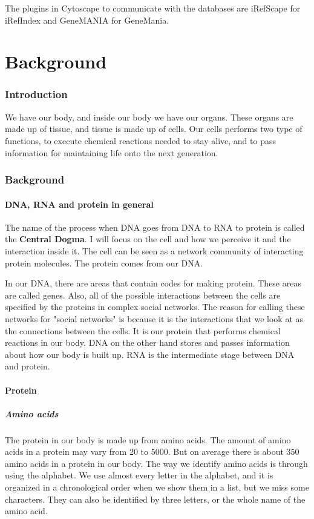 \documentclass[UKenglish,11pt,twoside,a4paper]{report}
\begin{document}
The plugins in Cytoscape to communicate with the databases are iRefScape \cite{iridb} for iRefIndex and GeneMANIA 
\cite{gmdb} for GeneMania.
\part{Background}
\section*{Introduction}
We have our body, and inside our body we have our organs. These organs are made up of tissue, and tissue is made up of
cells. Our cells performs two type of functions, to execute chemical reactions needed to stay alive, and to pass
information for maintaining life onto the next generation.
\section*{Background}
\subsection*{DNA, RNA and protein in general}
The name of the process when DNA goes from DNA to RNA to protein is called the \textbf{Central Dogma}. I will focus on
the cell and how we perceive it and the interaction inside it. The cell can be seen as a network community of
interacting protein molecules. The protein comes from our DNA.

In our DNA, there are areas that contain codes for making protein. These areas are called genes. Also, all of the
possible interactions between the cells are specified by the proteins in complex social networks. The reason for calling
these networks for "social networks" is because it is the interactions that we look at as the connections between the
cells. It is our protein that performs chemical reactions in our body. DNA on the other hand stores and passes
information about how our body is built up. RNA is the intermediate stage between DNA and protein.

\subsection*{Protein}
\subsubsection*{Amino acids}
The protein in our body is made up from amino acids. The amount of amino acids in a protein may vary from 20 to 5000. But
on average there is about 350 amino acids in a protein in our body. The way we identify amino acids is through using the
alphabet. We use almost every letter in the alphabet, and it is organized in a chronological order when we show
them in a list, but we miss some characters. They can also be identified by three letters, or the whole name of the
amino acid.
\end{document}

